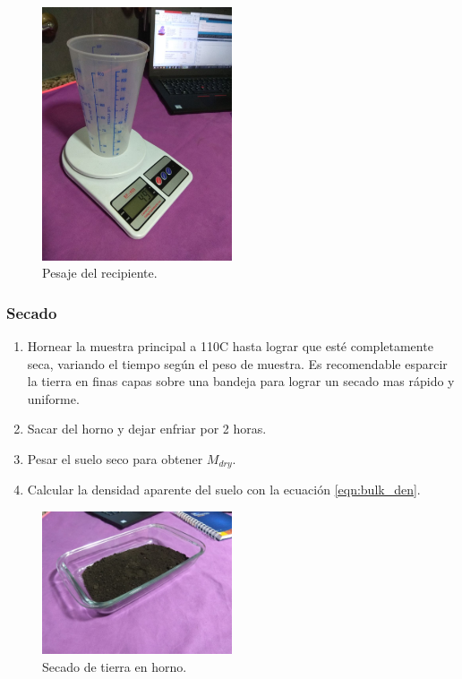 \begin{figure}[H]
    \centering
    \includegraphics[width=0.5\textwidth]{imagenes/imagenes calibracion/pesovaso.jpg}
    \caption{Pesaje del recipiente.}
    \label{fig:pesaje_vaso}
\end{figure}


\subsubsection{Secado}

\begin{enumerate}

    \item Hornear la muestra principal a 110\degree C hasta lograr que esté completamente seca, variando el tiempo según el peso de muestra. Es recomendable esparcir la tierra en finas capas sobre una bandeja para lograr un secado mas rápido y uniforme.
    \item Sacar del horno y dejar enfriar por 2 horas.
    \item Pesar el suelo seco para obtener $M_{dry}$.
    \item Calcular la densidad aparente del suelo con la ecuación \ref{eqn:bulk_den}.
    
\end{enumerate}

\begin{figure}[h!]
    \centering
    \includegraphics[width=0.5\textwidth]{imagenes/imagenes calibracion/horneado.jpg}
    \caption{Secado de tierra en horno.}
    \label{fig:secado}
\end{figure}
\newpage
